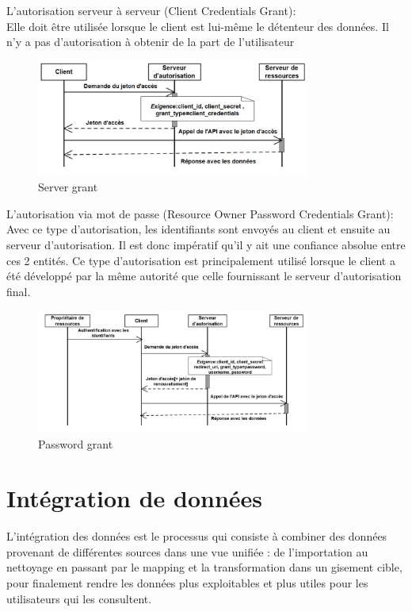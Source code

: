 \begin{list}{•}
	\item L’autorisation serveur à serveur (Client Credentials Grant):\\
	 Elle doit être utilisée lorsque le client est lui-même le détenteur des données. Il n’y a pas d’autorisation à obtenir de la part de l’utilisateur
	 \begin{figure}[H]
            \centering
                \includegraphics[width=0.8\textwidth]{Figures/server_server}
	       \decoRule
		\caption[Sever grant]{Server grant}
	\label{fig:Server}
	\end{figure}
	\newpage
	 \item L’autorisation via mot de passe (Resource Owner Password Credentials Grant):\\
	 Avec ce type d’autorisation, les identifiants sont envoyés au client et ensuite au serveur d’autorisation. Il est donc
	 impératif qu’il y ait une confiance absolue entre ces 2 entités. Ce type d’autorisation est principalement utilisé lorsque le client a été développé par la même autorité que celle          fournissant le serveur d’autorisation final.
	 \begin{figure}[H]
            \centering
                \includegraphics[width=0.8\textwidth]{Figures/password_grant}
	       \decoRule
		\caption[Password grant]{Password grant}
	\label{fig:Password}
	\end{figure}
\end{list}

\newpage
\section{Intégration de données}
L’intégration des données est le processus qui consiste à combiner des données provenant de différentes
sources dans une vue unifiée : de l’importation au nettoyage en passant par le mapping et la transformation dans un gisement cible, pour finalement rendre les données plus exploitables et plus utiles pour les
utilisateurs qui les consultent.
